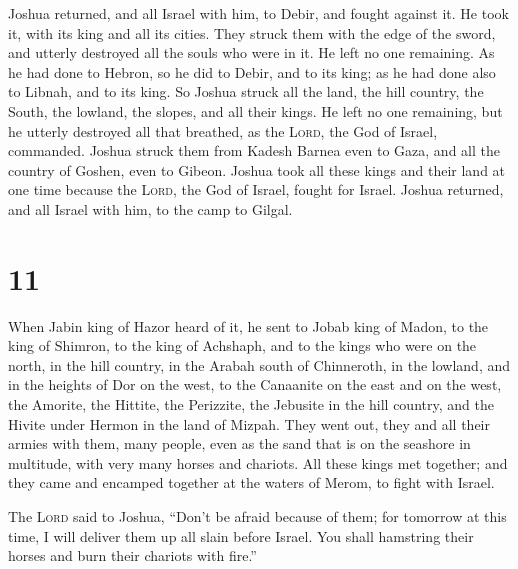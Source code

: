  Joshua returned, and all Israel with him, to Debir, and
fought against it.  He took it, with its king and all its
cities. They struck them with the edge of the sword, and utterly
destroyed all the souls who were in it. He left no one remaining. As he
had done to Hebron, so he did to Debir, and to its king; as he had done
also to Libnah, and to its king.  So Joshua struck all
the land, the hill country, the South, the lowland, the slopes, and all
their kings. He left no one remaining, but he utterly destroyed all that
breathed, as the \textsc{Lord}, the God of Israel, commanded.
 Joshua struck them from Kadesh Barnea even to Gaza, and
all the country of Goshen, even to Gibeon.  Joshua took
all these kings and their land at one time because the \textsc{Lord},
the God of Israel, fought for Israel.  Joshua returned,
and all Israel with him, to the camp to Gilgal.

\hypertarget{section-10}{%
\section{11}\label{section-10}}

 When Jabin king of Hazor heard of it, he sent to Jobab
king of Madon, to the king of Shimron, to the king of Achshaph,
 and to the kings who were on the north, in the hill
country, in the Arabah south of Chinneroth, in the lowland, and in the
heights of Dor on the west,  to the Canaanite on the east
and on the west, the Amorite, the Hittite, the Perizzite, the Jebusite
in the hill country, and the Hivite under Hermon in the land of Mizpah.
 They went out, they and all their armies with them, many
people, even as the sand that is on the seashore in multitude, with very
many horses and chariots.  All these kings met together;
and they came and encamped together at the waters of Merom, to fight
with Israel.

 The \textsc{Lord} said to Joshua, ``Don't be afraid
because of them; for tomorrow at this time, I will deliver them up all
slain before Israel. You shall hamstring their horses and burn their
chariots with fire.''

